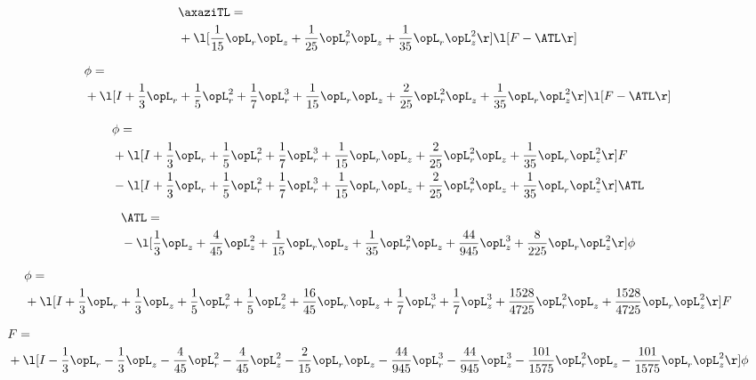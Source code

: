 \begin{alignat}{2} 
\label{eq:linaxaziTL_1} 
& \axaziTL = \\ 
& + \l[ \frac{1}{15} \opL_r \opL_z + \frac{1}{25} \opL_r^{2} \opL_z + \frac{1}{35} \opL_r \opL_z^{2}  \r] \l[ F - \ATL \r] \nonumber \\ 
\end{alignat} 


\begin{alignat}{2} 
\label{eq:scalarFlux_1} 
& \phi = \\ 
& + \l[ I + \frac{1}{3} \opL_r + \frac{1}{5} \opL_r^{2} + \frac{1}{7} \opL_r^{3} + \frac{1}{15} \opL_r \opL_z + \frac{2}{25} \opL_r^{2} \opL_z + \frac{1}{35} \opL_r \opL_z^{2}  \r] \l[ F - \ATL \r] \nonumber \\ 
\end{alignat} 


\begin{alignat}{2} 
\label{eq:scalarFlux_2} 
& \phi = \\ 
& + \l[ I + \frac{1}{3} \opL_r + \frac{1}{5} \opL_r^{2} + \frac{1}{7} \opL_r^{3} + \frac{1}{15} \opL_r \opL_z + \frac{2}{25} \opL_r^{2} \opL_z + \frac{1}{35} \opL_r \opL_z^{2}  \r] F \nonumber \\ 
& - \l[ I + \frac{1}{3} \opL_r + \frac{1}{5} \opL_r^{2} + \frac{1}{7} \opL_r^{3} + \frac{1}{15} \opL_r \opL_z + \frac{2}{25} \opL_r^{2} \opL_z + \frac{1}{35} \opL_r \opL_z^{2}  \r] \ATL \nonumber \\ 
\end{alignat} 


\begin{alignat}{2} 
\label{eq:isoATL_3} 
& \ATL = \\ 
& - \l[ \frac{1}{3} \opL_z + \frac{4}{45} \opL_z^{2} + \frac{1}{15} \opL_r \opL_z + \frac{1}{35} \opL_r^{2} \opL_z + \frac{44}{945} \opL_z^{3} + \frac{8}{225} \opL_r \opL_z^{2}  \r] \phi \nonumber \\ 
\end{alignat} 


\begin{alignat}{2} 
\label{eq:scalarFlux_3} 
& \phi = \\ 
& + \l[ I + \frac{1}{3} \opL_r + \frac{1}{3} \opL_z + \frac{1}{5} \opL_r^{2} + \frac{1}{5} \opL_z^{2} + \frac{16}{45} \opL_r \opL_z + \frac{1}{7} \opL_r^{3} + \frac{1}{7} \opL_z^{3} + \frac{1528}{4725} \opL_r^{2} \opL_z + \frac{1528}{4725} \opL_r \opL_z^{2}  \r] F \nonumber \\ 
\end{alignat} 


\begin{alignat}{2} 
\label{eq:transport3D_0} 
& F = \\ 
& + \l[ I - \frac{1}{3} \opL_r - \frac{1}{3} \opL_z - \frac{4}{45} \opL_r^{2} - \frac{4}{45} \opL_z^{2} - \frac{2}{15} \opL_r \opL_z - \frac{44}{945} \opL_r^{3} - \frac{44}{945} \opL_z^{3} - \frac{101}{1575} \opL_r^{2} \opL_z - \frac{101}{1575} \opL_r \opL_z^{2}  \r] \phi \nonumber \\ 
\end{alignat} 


